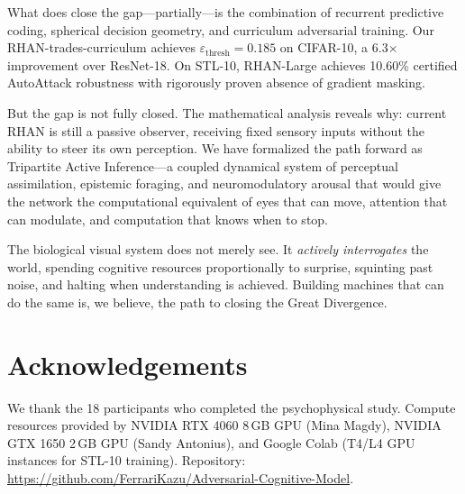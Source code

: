 \documentclass[12pt,a4paper]{article}
\begin{document}
What does close the gap---partially---is the combination of recurrent
predictive coding, spherical decision geometry, and curriculum adversarial
training. Our RHAN-trades-curriculum achieves
$\varepsilon_{\text{thresh}}{=}0.185$ on CIFAR-10, a 6.3$\times$ improvement
over ResNet-18. On STL-10, RHAN-Large achieves 10.60\% certified AutoAttack
robustness with rigorously proven absence of gradient masking.

But the gap is not fully closed. The mathematical analysis reveals why:
current RHAN is still a passive observer, receiving fixed sensory inputs
without the ability to steer its own perception. We have formalized the
path forward as Tripartite Active Inference---a coupled dynamical system
of perceptual assimilation, epistemic foraging, and neuromodulatory arousal
that would give the network the computational equivalent of eyes that can
move, attention that can modulate, and computation that knows when to stop.

The biological visual system does not merely see. It \textit{actively
interrogates} the world, spending cognitive resources proportionally to
surprise, squinting past noise, and halting when understanding is achieved.
Building machines that can do the same is, we believe, the path to closing
the Great Divergence.


\section*{Acknowledgements}

We thank the 18 participants who completed the psychophysical study.
Compute resources provided by NVIDIA RTX 4060 8\,GB GPU (Mina Magdy),
NVIDIA GTX 1650 2\,GB GPU (Sandy Antonius), and Google Colab (T4/L4 GPU
instances for STL-10 training).
Repository: \url{https://github.com/FerrariKazu/Adversarial-Cognitive-Model}.
\end{document}
